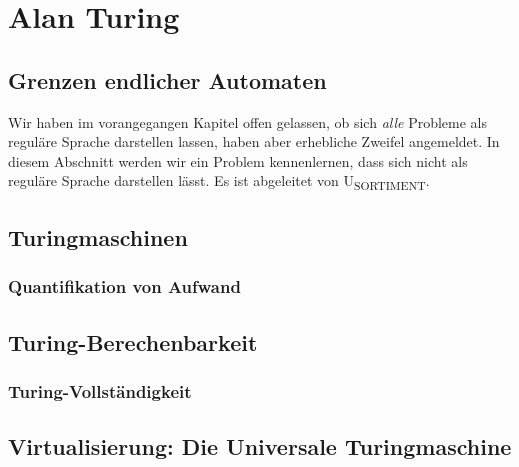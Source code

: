\chapter{Alan Turing}\label{turing}
\section{Grenzen endlicher Automaten}\label{pumping}
Wir haben im vorangegangen Kapitel offen gelassen,
ob sich \emph{alle} Probleme als reguläre Sprache darstellen lassen,
haben aber erhebliche Zweifel angemeldet.
In diesem Abschnitt werden wir ein Problem kennenlernen,
dass sich nicht als reguläre Sprache darstellen lässt.
Es ist abgeleitet von U\textsubscript{SORTIMENT}.


\section{Turingmaschinen}
\subsection{Quantifikation von Aufwand}
\section{Turing-Berechenbarkeit}
\subsection{Turing-Vollständigkeit}\label{turingVollstaendigkeit}
\section{Virtualisierung: Die Universale Turingmaschine}
